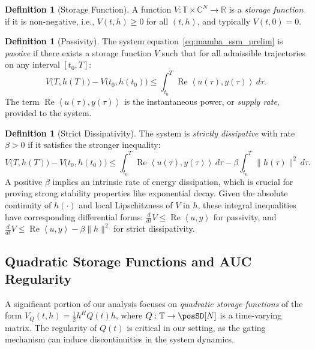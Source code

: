 \documentclass[10pt]{article} %
\def\eqref#1{equation~\ref{#1}}
\newcommand{\timeInt}{\mathbb T}                        %
\newcommand{\ip}[2]{\left\langle #1, #2 \right\rangle} %
\DeclareMathOperator{\realPart}{Re}                     %
\theoremstyle{definition}
\newtheorem{definition}[theorem]{Definition}
\begin{document}
\begin{definition}[Storage Function]
A function $V: \timeInt \times \mathbb{C}^N \to \mathbb{R}$ is a \emph{storage function} if it is non-negative, i.e., $V(t,h) \ge 0$ for all $(t,h)$, and typically $V(t,0)=0$.
\end{definition}

\begin{definition}[Passivity]
The system \eqref{eq:mamba_ssm_prelim} is \emph{passive} if there exists a storage function $V$ such that for all admissible trajectories on any interval $[t_0, T]$:
\begin{equation} \label{eq:passivity_ineq}
V\bigl(T,h(T)\bigr) - V\bigl(t_0,h(t_0)\bigr) \le \int_{t_0}^{T} \realPart\ip{u(\tau)}{y(\tau)}\,d\tau.
\end{equation}
The term $\realPart\ip{u(\tau)}{y(\tau)}$ is the instantaneous power, or \emph{supply rate}, provided to the system.
\end{definition}

\begin{definition}[Strict Dissipativity]
The system is \emph{strictly dissipative} with rate $\beta > 0$ if it satisfies the stronger inequality:
\begin{equation} \label{eq:strict_dissipativity_ineq_prelim}
V\bigl(T,h(T)\bigr) - V\bigl(t_0,h(t_0)\bigr) \le \int_{t_0}^{T} \realPart\ip{u(\tau)}{y(\tau)}\,d\tau - \beta \int_{t_0}^{T} \|h(\tau)\|^2 \,d\tau.
\end{equation}
A positive $\beta$ implies an intrinsic rate of energy dissipation, which is crucial for proving strong stability properties like exponential decay. Given the absolute continuity of $h(\cdot)$ and local Lipschitzness of $V$ in $h$, these integral inequalities have corresponding differential forms: $\frac{d}{dt} V \le \realPart\ip{u}{y}$ for passivity, and $\frac{d}{dt} V \le \realPart\ip{u}{y} - \beta \|h\|^2$ for strict dissipativity.
\end{definition} 

\subsection{Quadratic Storage Functions and AUC Regularity}
A significant portion of our analysis focuses on \emph{quadratic storage functions} of the form $V_Q(t,h) = \tfrac{1}{2} h^H Q(t) h$, where $Q: \timeInt \to \posSD[N]$ is a time-varying matrix. The regularity of $Q(t)$ is critical in our setting, as the gating mechanism can induce discontinuities in the system dynamics.
\end{document}
